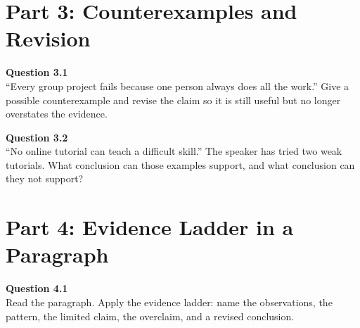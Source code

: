 \documentclass[12pt]{article}
\begin{document}

\newpage

\section*{Part 3: Counterexamples and Revision}

\textbf{Question 3.1}\\[-0.15em]
``Every group project fails because one person always does all the work.'' Give a possible counterexample and revise the claim so it is still useful but no longer overstates the evidence.


\textbf{Question 3.2}\\[-0.15em]
``No online tutorial can teach a difficult skill.'' The speaker has tried two weak tutorials. What conclusion can those examples support, and what conclusion can they not support?


\newpage

\section*{Part 4: Evidence Ladder in a Paragraph}

\textbf{Question 4.1}\\[-0.15em]
Read the paragraph. Apply the evidence ladder: name the observations, the pattern, the limited claim, the overclaim, and a revised conclusion.

\vspace{0.2em}

\noindent{}

\end{document}

